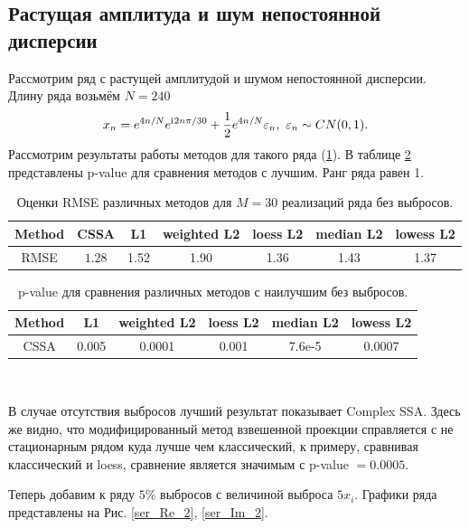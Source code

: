 \documentclass[specialist,
               substylefile = spbu.rtx,
               subf,href,colorlinks=true, 12pt]{disser}
\begin{document}
\subsection{Растущая амплитуда и шум непостоянной дисперсии}

Рассмотрим ряд с растущей амплитудой и шумом непостоянной дисперсии.
Длину ряда возьмём $N = 240$
$$x_n = e^{4n/N} e^{\mathrm{i}\mkern1mu 2n\pi/30} + \frac{1}{2}e^{4n/N} \varepsilon_n, ~ \varepsilon_n \sim CN(0,1).$$ 
Рассмотрим результаты работы методов для такого ряда (\ref{tab3}).  В таблице \ref{tab: pval3} представлены p-value для сравнения методов с лучшим. Ранг ряда равен 1.

\begin{table}[H]
	\begin{center}
		\caption{Оценки RMSE различных методов для $M = 30$ реализаций ряда без выбросов.}
		\label{tab3}
		\begin{tabular}{|c|c|c|c|c|c|c|}
			\hline
			Method 	& CSSA & L1 & weighted L2 & loess L2 & median L2 & lowess L2 \\ 
			\hline
			RMSE & $\mathbf{1.28}$  & 1.52  & 1.90 & 1.36 & 1.43 & 1.37\\
			\hline
		\end{tabular}
	\end{center}
\end{table}

\begin{table}[H]
	\caption{p-value для сравнения различных методов с наилучшим без выбросов.}
	\label{tab: pval3}
	\begin{center}
		\begin{tabular}{|c|c|c|c|c|c|}
			\hline
			Method & L1 & weighted L2 & loess L2 & median L2 & lowess L2  \\ 
			\hline
			CSSA & 0.005   & 0.0001 & 0.001  & 7.6e-5 & 0.0007  \\
			\hline
		\end{tabular} \\
	\end{center}
\end{table}

В случае отсутствия выбросов лучший результат показывает Complex SSA. Здесь же видно, что модифицированный метод взвешенной проекции справляется с не стационарным рядом куда лучше чем классический, к примеру, сравнивая классический и loess, сравнение является значимым с p-value $ = 0.0005$. 

Теперь добавим к ряду $5\%$ выбросов с величиной выброса $5x_i$. Графики ряда представлены на Рис. \ref{ser_Re_2}, \ref{ser_Im_2}.
\end{document}
